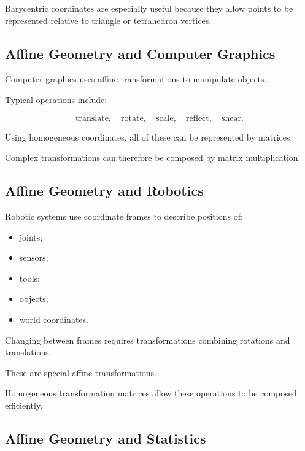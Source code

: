 Barycentric coordinates are especially useful because they allow points to
be represented relative to triangle or tetrahedron vertices.

\subsection{Affine Geometry and Computer Graphics}
\label{subsec:affine-computer-graphics}

Computer graphics uses affine transformations to manipulate objects.

Typical operations include:

\[
\text{translate},
\quad
\text{rotate},
\quad
\text{scale},
\quad
\text{reflect},
\quad
\text{shear}.
\]

Using homogeneous coordinates, all of these can be represented by matrices.

Complex transformations can therefore be composed by matrix multiplication.

\subsection{Affine Geometry and Robotics}
\label{subsec:affine-robotics}

Robotic systems use coordinate frames to describe positions of:

\begin{itemize}
    \item joints;
    \item sensors;
    \item tools;
    \item objects;
    \item world coordinates.
\end{itemize}

Changing between frames requires transformations combining rotations and
translations.

These are special affine transformations.

Homogeneous transformation matrices allow these operations to be composed
efficiently.

\subsection{Affine Geometry and Statistics}
\label{subsec:affine-statistics}

